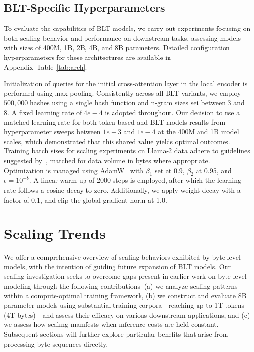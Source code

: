 \subsection{{\textsc BLT}-Specific Hyperparameters} To evaluate the capabilities of {\textsc BLT} models, we carry out experiments focusing on both scaling behavior and performance on downstream tasks, assessing models with sizes of 400M, 1B, 2B, 4B, and 8B parameters. Detailed configuration hyperparameters for these architectures are available in Appendix~Table~\ref{tab:arch}.

Initialization of queries for the initial cross-attention layer in the local encoder is performed using max-pooling. Consistently across all {\textsc BLT} variants, we employ $500,000$ hashes using a single hash function and n-gram sizes set between 3 and 8. A fixed learning rate of $4e-4$ is adopted throughout. Our decision to use a matched learning rate for both token-based and {\textsc BLT} models results from hyperparameter sweeps between $1e-3$ and $1e-4$ at the 400M and 1B model scales, which demonstrated that this shared value yields optimal outcomes. Training batch sizes for scaling experiments on Llama-2 data adhere to guidelines suggested by~\cite{dubey2024llama}, matched for data volume in bytes where appropriate. Optimization is managed using AdamW~\citep{adamw} with $\beta_1$ set at 0.9, $\beta_2$ at 0.95, and $\epsilon=10^{-8}$. A linear warm-up of 2000 steps is employed, after which the learning rate follows a cosine decay to zero. Additionally, we apply weight decay with a factor of 0.1, and clip the global gradient norm at 1.0.

\section{Scaling Trends}
\label{section:scaling}

We offer a comprehensive overview of scaling behaviors exhibited by byte-level models, with the intention of guiding future expansion of {\textsc BLT} models. Our scaling investigation seeks to overcome gaps present in earlier work on byte-level modeling through the following contributions: (a) we analyze scaling patterns within a compute-optimal training framework, (b) we construct and evaluate 8B parameter models using substantial training corpora—reaching up to 1T tokens (4T bytes)—and assess their efficacy on various downstream applications, and (c) we assess how scaling manifests when inference costs are held constant. Subsequent sections will further explore particular benefits that arise from processing byte-sequences directly.

